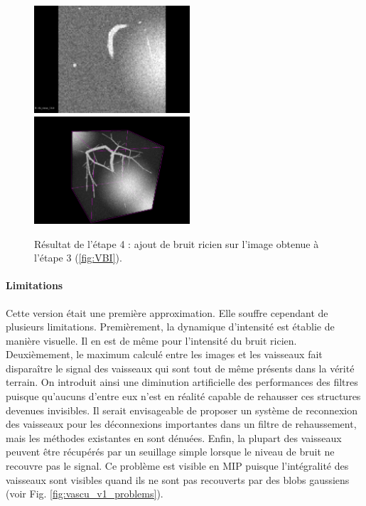 \begin{figure}[!ht]
  \centering
  \includegraphics[height=4cm]{Images/2D_VBIR10.png}
  \includegraphics[height=4cm]{Images/3D_VBIR10.png}
  
  \caption{Résultat de l'étape 4 : ajout de bruit ricien sur l'image obtenue à l'étape 3 (\ref{fig:VBI}).}
  \label{fig:VBIR}
\end{figure}

\paragraph{Limitations} Cette version était une première approximation. Elle souffre cependant de plusieurs limitations. Premièrement, la dynamique d'intensité est établie de manière visuelle. Il en est de même pour l'intensité du bruit ricien. Deuxièmement, le maximum calculé entre les images et les vaisseaux fait disparaître le signal des vaisseaux qui sont tout de même présents dans la vérité terrain. On introduit ainsi une diminution artificielle des performances des filtres puisque qu'aucuns d'entre eux n'est en réalité capable de rehausser ces structures devenues invisibles. Il serait envisageable de proposer un système de reconnexion des vaisseaux pour les déconnexions importantes dans un filtre de rehaussement, mais les méthodes existantes en sont dénuées. Enfin, la plupart des vaisseaux peuvent être récupérés par un seuillage simple lorsque le niveau de bruit ne recouvre pas le signal. Ce problème est visible en MIP puisque l'intégralité des vaisseaux sont visibles quand ils ne sont pas recouverts par des blobs gaussiens (voir Fig. \ref{fig:vascu_v1_problems}).

